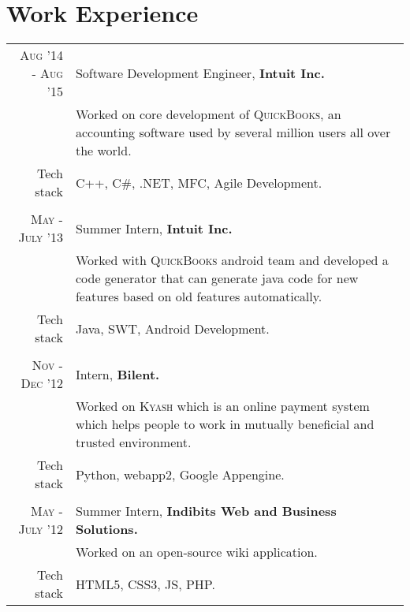 \documentclass[a4paper,10pt]{article} %
\begin{document}

\section{Work Experience}
\renewcommand{\arraystretch}{0.85}%
\begin{tabular}{r|p{11cm}}
\textsc{Aug '14 - Aug '15} & Software Development Engineer, \textbf{Intuit Inc.} \\
& \footnotesize{Worked on core development of \textsc{QuickBooks}, an accounting software used by several million users all over the world.}\\
\footnotesize{Tech stack} &\footnotesize{C++, C\#, .NET, MFC, Agile Development.} \\
\multicolumn{2}{c}{} \\

\textsc{May - July '13} & Summer Intern, \textbf{Intuit Inc.}\\ 
& \footnotesize{Worked with \textsc{QuickBooks} android  team and developed a code generator that can generate java code for new features based on old features automatically.}\\
\footnotesize{Tech stack} &\footnotesize{Java, SWT, Android Development.} \\
\multicolumn{2}{c}{} \\


\textsc{Nov - Dec '12} & Intern, \textbf{Bilent.}\\
& \footnotesize{Worked on \textsc{Kyash} which is an online payment system which helps people to
work in mutually beneficial and trusted environment.}\\
\footnotesize{Tech stack} &\footnotesize{Python, webapp2, Google Appengine.} \\
\multicolumn{2}{c}{} \\


\textsc{May - July '12} & Summer Intern, \textbf{Indibits Web and Business Solutions.}\\
& \footnotesize{Worked on an open-source wiki application.}\\
\footnotesize{Tech stack} &\footnotesize{HTML5, CSS3, JS, PHP.} \\
\end{tabular}
\end{document}
